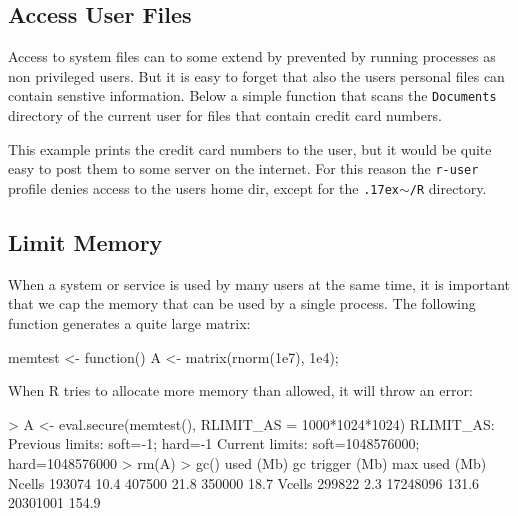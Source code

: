 \documentclass[article]{jss}
\begin{document}
\begin{appendices}
\subsection{Access User Files}
\label{creditcard}

Access to system files can to some extend by prevented by running processes as
non privileged users. But it is easy to forget that also the users personal
files can contain senstive information. Below a simple function that scans the
\texttt{Documents} directory of the current user for files that contain credit
card numbers. 

\begin{CodeChunk}
\end{CodeChunk}

This example prints the credit card numbers to the user, but it would be quite
easy to post them to some server on the internet. For this reason the
\texttt{r-user} profile denies access to the users home dir, except for the 
\texttt{{\raise.17ex\hbox{$\scriptstyle\sim$}}/R} directory.


\subsection{Limit Memory}

When a system or service is used by many users at the same time, it is important
that we cap the memory that can be used by a single process. The following
function generates a quite large matrix:

\begin{CodeChunk}
\begin{CodeInput}
memtest <- function(){
	A <- matrix(rnorm(1e7), 1e4);
}
\end{CodeInput}
\end{CodeChunk}

When R tries to allocate more memory than allowed, it will throw an error:

\begin{CodeChunk}
\begin{CodeInput}
> A <- eval.secure(memtest(), RLIMIT_AS = 1000*1024*1024)
RLIMIT_AS:
Previous limits: soft=-1; hard=-1
Current limits: soft=1048576000; hard=1048576000
> rm(A)
> gc()
         used (Mb) gc trigger  (Mb) max used  (Mb)
Ncells 193074 10.4     407500  21.8   350000  18.7
Vcells 299822  2.3   17248096 131.6 20301001 154.9



\end{CodeInput}
\end{CodeChunk}
\end{appendices}
\end{document}
